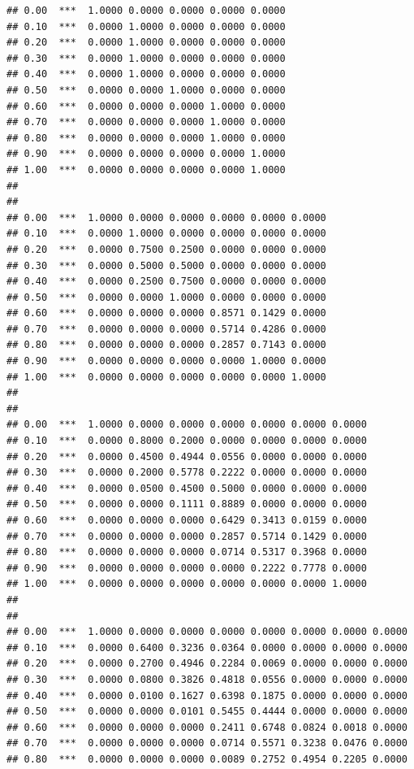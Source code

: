 \documentclass[
  12pt,
]{article}
\begin{document}
\begin{verbatim}
## 0.00  ***  1.0000 0.0000 0.0000 0.0000 0.0000 
## 0.10  ***  0.0000 1.0000 0.0000 0.0000 0.0000 
## 0.20  ***  0.0000 1.0000 0.0000 0.0000 0.0000 
## 0.30  ***  0.0000 1.0000 0.0000 0.0000 0.0000 
## 0.40  ***  0.0000 1.0000 0.0000 0.0000 0.0000 
## 0.50  ***  0.0000 0.0000 1.0000 0.0000 0.0000 
## 0.60  ***  0.0000 0.0000 0.0000 1.0000 0.0000 
## 0.70  ***  0.0000 0.0000 0.0000 1.0000 0.0000 
## 0.80  ***  0.0000 0.0000 0.0000 1.0000 0.0000 
## 0.90  ***  0.0000 0.0000 0.0000 0.0000 1.0000 
## 1.00  ***  0.0000 0.0000 0.0000 0.0000 1.0000 
## 
## 
## 0.00  ***  1.0000 0.0000 0.0000 0.0000 0.0000 0.0000 
## 0.10  ***  0.0000 1.0000 0.0000 0.0000 0.0000 0.0000 
## 0.20  ***  0.0000 0.7500 0.2500 0.0000 0.0000 0.0000 
## 0.30  ***  0.0000 0.5000 0.5000 0.0000 0.0000 0.0000 
## 0.40  ***  0.0000 0.2500 0.7500 0.0000 0.0000 0.0000 
## 0.50  ***  0.0000 0.0000 1.0000 0.0000 0.0000 0.0000 
## 0.60  ***  0.0000 0.0000 0.0000 0.8571 0.1429 0.0000 
## 0.70  ***  0.0000 0.0000 0.0000 0.5714 0.4286 0.0000 
## 0.80  ***  0.0000 0.0000 0.0000 0.2857 0.7143 0.0000 
## 0.90  ***  0.0000 0.0000 0.0000 0.0000 1.0000 0.0000 
## 1.00  ***  0.0000 0.0000 0.0000 0.0000 0.0000 1.0000 
## 
## 
## 0.00  ***  1.0000 0.0000 0.0000 0.0000 0.0000 0.0000 0.0000 
## 0.10  ***  0.0000 0.8000 0.2000 0.0000 0.0000 0.0000 0.0000 
## 0.20  ***  0.0000 0.4500 0.4944 0.0556 0.0000 0.0000 0.0000 
## 0.30  ***  0.0000 0.2000 0.5778 0.2222 0.0000 0.0000 0.0000 
## 0.40  ***  0.0000 0.0500 0.4500 0.5000 0.0000 0.0000 0.0000 
## 0.50  ***  0.0000 0.0000 0.1111 0.8889 0.0000 0.0000 0.0000 
## 0.60  ***  0.0000 0.0000 0.0000 0.6429 0.3413 0.0159 0.0000 
## 0.70  ***  0.0000 0.0000 0.0000 0.2857 0.5714 0.1429 0.0000 
## 0.80  ***  0.0000 0.0000 0.0000 0.0714 0.5317 0.3968 0.0000 
## 0.90  ***  0.0000 0.0000 0.0000 0.0000 0.2222 0.7778 0.0000 
## 1.00  ***  0.0000 0.0000 0.0000 0.0000 0.0000 0.0000 1.0000 
## 
## 
## 0.00  ***  1.0000 0.0000 0.0000 0.0000 0.0000 0.0000 0.0000 0.0000 
## 0.10  ***  0.0000 0.6400 0.3236 0.0364 0.0000 0.0000 0.0000 0.0000 
## 0.20  ***  0.0000 0.2700 0.4946 0.2284 0.0069 0.0000 0.0000 0.0000 
## 0.30  ***  0.0000 0.0800 0.3826 0.4818 0.0556 0.0000 0.0000 0.0000 
## 0.40  ***  0.0000 0.0100 0.1627 0.6398 0.1875 0.0000 0.0000 0.0000 
## 0.50  ***  0.0000 0.0000 0.0101 0.5455 0.4444 0.0000 0.0000 0.0000 
## 0.60  ***  0.0000 0.0000 0.0000 0.2411 0.6748 0.0824 0.0018 0.0000 
## 0.70  ***  0.0000 0.0000 0.0000 0.0714 0.5571 0.3238 0.0476 0.0000 
## 0.80  ***  0.0000 0.0000 0.0000 0.0089 0.2752 0.4954 0.2205 0.0000 

\end{verbatim}
\end{document}
